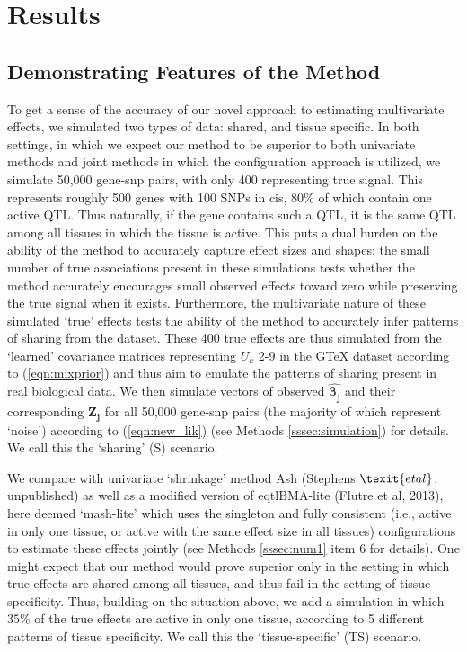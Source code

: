 
\section{Results}
\subsection{Demonstrating Features of the Method}

To get a sense of the accuracy of our novel approach to estimating multivariate effects, we simulated two types of data: shared, and tissue specific. In both settings, in which we expect our method to be superior to both univariate methods and joint methods in which the configuration approach is utilized, we simulate 50,000 gene-snp pairs, with only 400 representing true signal. This represents roughly 500 genes with 100 SNPs in cis, $80\%$ of which contain one active QTL. Thus naturally, if the gene contains such a QTL, it is the same QTL among all tissues in which the tissue is active. This puts a dual burden on the ability of the method to accurately capture effect sizes and shapes: the small number of true associations present in these simulations tests whether the method accurately encourages small observed effects toward zero while preserving the true signal when it exists. Furthermore, the  multivariate nature of these simulated `true' effects tests the ability of the method to accurately infer patterns of sharing from the dataset. These 400 true effects are thus simulated from the `learned' covariance matrices representing $U_{k}$ 2-9 in the GTeX dataset according to (\ref{eqn:mixprior}) and thus aim to emulate the patterns of sharing present in real biological data. We then simulate vectors of observed $\bm{\hat{\beta_{j}}}$ and their corresponding $\bm{Z_{j}}$ for all 50,000 gene-snp pairs (the majority of which represent `noise') according to (\ref{eqn:new_lik}) (see Methods \ref{sssec:simulation}) for details. %
 We call this the `sharing' (S) scenario. 

 We compare with univariate `shrinkage' method Ash (Stephens $\texit{et al}$, unpublished) as well as a modified version of eqtlBMA-lite (Flutre et al, 2013), here deemed `mash-lite' which uses the singleton and fully consistent (i.e., active in only one tissue, or active with the same effect size in all tissues) configurations to estimate these effects jointly (see Methods \ref{sssec:num1} item 6 for details).  
 One might expect that our method would prove superior only in the setting in which true effects are shared among all tissues, and thus fail in the setting of tissue specificity. Thus, building on the situation above, we add a simulation in which $35\%$ of the true effects are active in only one tissue, according to 5 different patterns of tissue specificity. We call this the `tissue-specific' (TS) scenario. 

